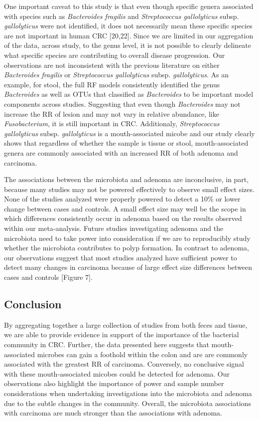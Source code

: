 \documentclass[12pt,]{article}
\begin{document}
One important caveat to this study is that even though specific genera
associated with species such as \emph{Bacteroides fragilis} and
\emph{Streptococcus gallolyticus} subsp. \emph{gallolyticus} were not
identified, it does not necessarily mean these specific species are not
important in human CRC {[}20,22{]}. Since we are limited in our
aggregation of the data, across study, to the genus level, it is not
possible to clearly delineate what specific species are contributing to
overall disease progression. Our observations are not inconsistent with
the previous literature on either \emph{Bacteroides fragilis} or
\emph{Streptococcus gallolyticus} subsp. \emph{gallolyticus}. As an
example, for stool, the full RF models consistently identified the genus
\emph{Bacteroides} as well as OTUs that classified as \emph{Bacteroides}
to be important model components across studies. Suggesting that even
though \emph{Bacteroides} may not increase the RR of lesion and may not
vary in relative abundance, like \emph{Fusobacterium}, it is still
important in CRC. Additionaly, \emph{Streptococcus gallolyticus} subsp.
\emph{gallolyticus} is a mouth-associated micobe and our study clearly
shows that regardless of whether the sample is tissue or stool,
mouth-associated genera are commonly associated with an increased RR of
both adenoma and carcinoma.

The associations between the microbiota and adenoma are inconclusive, in
part, because many studies may not be powered effectively to observe
small effect sizes. None of the studies analyzed were properly powered
to detect a 10\% or lower change between cases and controls. A small
effect size may well be the scope in which differences consistently
occur in adenoma based on the results observed within our meta-analysis.
Future studies investigating adenoma and the microbiota need to take
power into consideration if we are to reproducibly study whether the
microbiota contributes to polyp formation. In contrast to adenoma, our
observations suggest that most studies analyzed have sufficient power to
detect many changes in carcinoma because of large effect size
differences between cases and controls {[}Figure 7{]}.

\newpage

\subsection{Conclusion}\label{conclusion}

By aggregating together a large collection of studies from both feces
and tissue, we are able to provide evidence in support of the importance
of the bacterial community in CRC. Further, the data presented here
suggests that mouth-associated microbes can gain a foothold within the
colon and are are commonly associated with the greatest RR of carcinoma.
Conversely, no conclusive signal with these mouth-associated micobes
could be detected for adenoma. Our observations also highlight the
importance of power and sample number considerations when undertaking
investigations into the microbiota and adenoma due to the subtle changes
in the community. Overall, the microbiota associations with carcinoma
are much stronger than the associations with adenoma.
\end{document}
